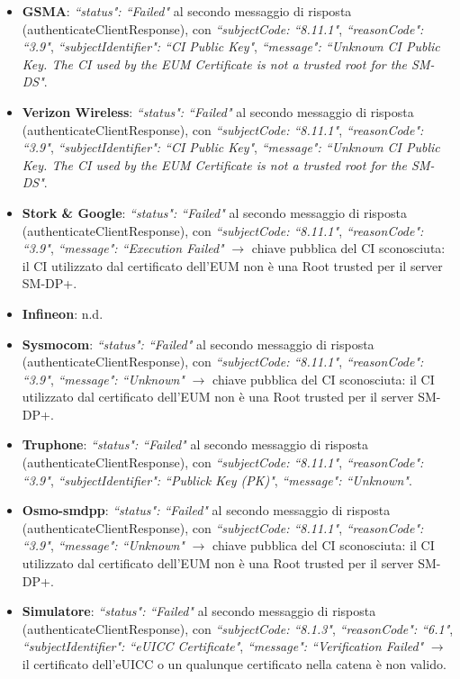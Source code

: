 \documentclass[10pt, oneside]{book}
\begin{document}
\begin{itemize}
\item \textbf{GSMA}: \textit{``status": ``Failed"} al secondo messaggio di risposta (authenticateClientResponse), con \textit{``subjectCode: ``8.11.1"}, \textit{``reasonCode": ``3.9"}, \textit{``subjectIdentifier": ``CI Public Key"}, \textit{``message": ``Unknown CI Public Key. The CI used by the EUM Certificate is not a trusted root for the SM-DS"}.
\item \textbf{Verizon Wireless}: \textit{``status": ``Failed"} al secondo messaggio di risposta (authenticateClientResponse), con \textit{``subjectCode: ``8.11.1"}, \textit{``reasonCode": ``3.9"}, \textit{``subjectIdentifier": ``CI Public Key"}, \textit{``message": ``Unknown CI Public Key. The CI used by the EUM Certificate is not a trusted root for the SM-DS"}.
\item \textbf{Stork \& Google}: \textit{``status": ``Failed"} al secondo messaggio di risposta (authenticateClientResponse), con \textit{``subjectCode: ``8.11.1"}, \textit{``reasonCode": ``3.9"}, \textit{``message": ``Execution Failed"} $\rightarrow$ chiave pubblica del CI sconosciuta: il CI utilizzato dal certificato dell'EUM non è una Root trusted per il server SM-DP+.
\item \textbf{Infineon}: n.d.
\item \textbf{Sysmocom}: \textit{``status": ``Failed"} al secondo messaggio di risposta (authenticateClientResponse), con \textit{``subjectCode: ``8.11.1"}, \textit{``reasonCode": ``3.9"}, \textit{``message": ``Unknown"} $\rightarrow$ chiave pubblica del CI sconosciuta: il CI utilizzato dal certificato dell'EUM non è una Root trusted per il server SM-DP+.
\item \textbf{Truphone}: \textit{``status": ``Failed"} al secondo messaggio di risposta (authenticateClientResponse), con \textit{``subjectCode: ``8.11.1"}, \textit{``reasonCode": ``3.9"}, \textit{``subjectIdentifier": ``Publick Key (PK)"}, \textit{``message": ``Unknown"}.
\item \textbf{Osmo-smdpp}: \textit{``status": ``Failed"} al secondo messaggio di risposta (authenticateClientResponse), con \textit{``subjectCode: ``8.11.1"}, \textit{``reasonCode": ``3.9"}, \textit{``message": ``Unknown"} $\rightarrow$ chiave pubblica del CI sconosciuta: il CI utilizzato dal certificato dell'EUM non è una Root trusted per il server SM-DP+.
\item \textbf{Simulatore}: \textit{``status": ``Failed"} al secondo messaggio di risposta (authenticateClientResponse), con \textit{``subjectCode: ``8.1.3"}, \textit{``reasonCode": ``6.1"}, \textit{``subjectIdentifier": ``eUICC Certificate"}, \textit{``message": ``Verification Failed"} $\rightarrow$ il certificato dell'eUICC o un qualunque certificato nella catena è non valido.
\end{itemize}
\end{document}
